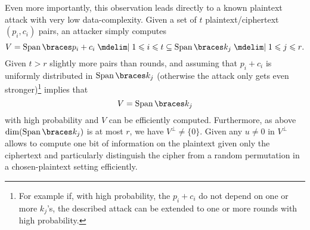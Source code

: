 Even more importantly, this observation leads directly to a known plaintext attack with very low data-complexity.
Given a set of $t$ plaintext/ciphertext $(p_i,c_i)$ pairs, an attacker simply computes
\begin{equation*}
    V = \Span{p_i+c_i \given 1 \leqslant i \leqslant t} \subseteq \Span{k_j \given 1 \leqslant j \leqslant r}.
\end{equation*}
Given $t > r$  slightly more pairs than rounds, and assuming that $p_i+c_i$ is uniformly distributed in $\Span{k_j}$ (otherwise the attack only gets even stronger)\footnote{%
    For example if, with high probability, the $p_i + c_i$ do not depend on one or more $k_j$'s, the described attack can be extended to one or more rounds with high probability.
}
implies that
\begin{equation*}
    V= \Span{k_j}
\end{equation*}
with high probability and $V$ can be efficiently computed.
Furthermore, as above $\dim(\Span{k_j})$ is at most $r$, we have $V^{\perp} \ne \{0\}$.
Given any $u \ne 0$ in $V^\perp$ allows to compute one bit of information on the plaintext given only the ciphertext and particularly distinguish the cipher from a random permutation in a chosen-plaintext setting efficiently.

